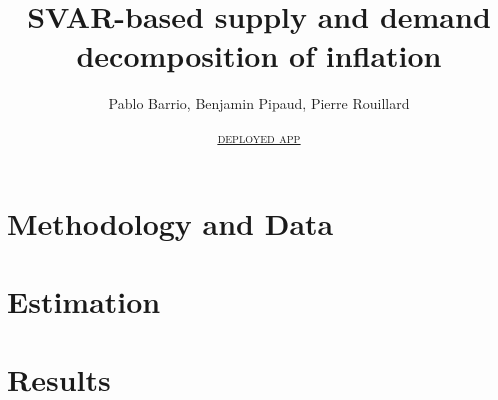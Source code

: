\documentclass[letterpaper,12pt,leqno]{article}
\begin{document}
\title{SVAR-based supply and demand decomposition of inflation}
\author{Pablo Barrio, Benjamin Pipaud, Pierre Rouillard}
\date{\href{https://pierrerlld-svar3a-mainstreamlit-app-qy5le2.streamlit.app/}{\textsc{\underline{deployed app}}}}

\begin{titlepage}
\maketitle
\tableofcontents
\end{titlepage}

\section{Methodology and Data}\label{sec:sec1}

\section{Estimation}\label{sec:sec2}

\section{Results}\label{sec:sec3}

\end{document}
